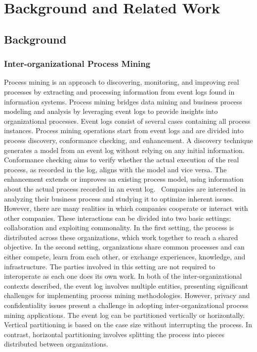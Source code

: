 \section{Background and Related Work}
\begin{newj}
\subsection{Background}
\label{sec:background}
\subsubsection{Inter-organizational Process Mining}
Process mining is an approach to discovering, monitoring, and improving real processes by extracting and processing information from event logs found in information systems. Process mining bridges data mining and business process modeling and analysis by leveraging event logs to provide insights into organizational processes. Event logs consist of several cases containing all process instances.\cite{van2012process} Process mining operations start from event logs and are divided into process discovery, conformance checking, and enhancement. A discovery technique generates a model from an event log without relying on any initial information. Conformance checking aims to verify whether the actual execution of the real process, as recorded in the log, aligns with the model and vice versa. The enhancement extends or improves an existing process model, using information about the actual process recorded in an event log.~\cite{DBLP:journals/tmis/Aalst12} Companies are interested in analyzing their business process and studying it to optimize inherent issues. However, there are many realities in which companies cooperate or interact with other companies. These interactions can be divided into two basic settings: collaboration and exploiting commonality. In the first setting, the process is distributed across these organizations, which work together to reach a shared objective. In the second setting, organizations share common processes and can either compete, learn from each other, or exchange experiences, knowledge, and infrastructure. The parties involved in this setting are not required to interoperate as each one does its own work. In both of the inter-organizational contexts described, the event log involves multiple entities, presenting significant challenges for implementing process mining methodologies. However, privacy and confidentiality issues present a challenge in adopting inter-organizational process mining applications. The event log can be partitioned vertically or horizontally. Vertical partitioning is based on the case size without interrupting the process. In contrast, horizontal partitioning involves splitting the process into pieces distributed between organizations.~\cite{van2011intra} 





\end{newj}
